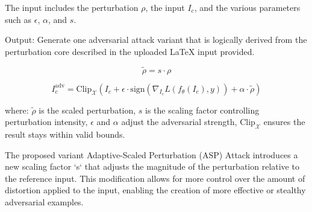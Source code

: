 The input includes the perturbation $\rho$, the input $I_c$, and the various parameters such as $\epsilon$, $\alpha$, and $s$.

Output: Generate one adversarial attack variant that is logically derived from the perturbation core described in the uploaded LaTeX input provided. 

\[
\tilde{\rho} = s \cdot \rho
\]

\[
I_c^{\text{adv}} = \text{Clip}_{\mathcal{X}} \left( I_c + \epsilon \cdot \text{sign}(\nabla_{I_c} L(f_{\theta}(I_c), y)) + \alpha \cdot \tilde{\rho} \right)
\]

where:
$\tilde{\rho}$ is the scaled perturbation,
$s$ is the scaling factor controlling perturbation intensity,
$\epsilon$ and $\alpha$ adjust the adversarial strength,
$\text{Clip}_{\mathcal{X}}$ ensures the result stays within valid bounds.

The proposed variant Adaptive-Scaled Perturbation (ASP) Attack introduces a new scaling factor `s` that adjusts the magnitude of the perturbation relative to the reference input. This modification allows for more control over the amount of distortion applied to the input, enabling the creation of more effective or stealthy adversarial examples.
